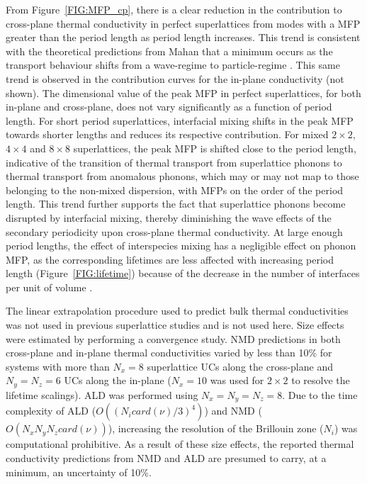 \documentclass[aps,prb,preprint,preprintnumbers,amsmath,amssymb,floatfix,superscriptaddress]{revtex4}
\begin{document}
From Figure~\ref{FIG:MFP_cp}, there is a clear reduction in the contribution to cross-plane thermal conductivity in perfect superlattices from modes with a MFP greater than the period length as period length increases. This trend is consistent with the theoretical predictions from Mahan that a minimum occurs as the transport behaviour shifts from a wave-regime to particle-regime \cite{PhysRevLett.84.927,PhysRevB.56.10754}. This same trend is observed in the contribution curves for the in-plane conductivity (not shown). The dimensional value of the peak MFP in perfect superlattices, for both in-plane and cross-plane, does not vary significantly as a function of period length. For short period superlattices, interfacial mixing shifts in the peak MFP towards shorter lengths and reduces its respective contribution. For mixed $2\times2$, $4\times4$ and $8\times8$ superlattices, the peak MFP is shifted close to the period length, indicative of the transition of thermal transport from superlattice phonons to thermal transport from anomalous phonons, which may or may not map to those belonging to the non-mixed dispersion, with MFPs on the order of the period length. This trend further supports the fact that superlattice phonons become disrupted by interfacial mixing, thereby diminishing the wave effects of the secondary periodicity upon cross-plane thermal conductivity. At large enough period lengths, the effect of interspecies mixing has a negligible effect on phonon MFP, as the corresponding lifetimes are less affected with increasing period length (Figure~\ref{FIG:lifetime}) because of the decrease in the number of interfaces per unit of volume \cite{PhysRevB.79.075316}.

The linear extrapolation procedure used to predict bulk thermal conductivities \cite{PhysRevB.81.214305} was not used in previous superlattice studies \cite{doi:10.1021/nl202186y,Luckyanova16112012} and is not used here. Size effects were estimated by performing a convergence study. NMD predictions in both cross-plane and in-plane thermal conductivities varied by less than 10\% for systems with more than $N_x=8$ superlattice UCs along the cross-plane and $N_y=N_z=6$ UCs along the in-plane ($N_x=10$ was used for $2\times2$ to resolve the lifetime scalings). ALD was performed using $N_x=N_y=N_z=8$. Due to the time complexity of ALD ($O((N_i card(\nu)/3)^4)$) and NMD ($O(N_x  N_y N_z card(\nu))$), increasing the resolution of the Brillouin zone ($N_i$) was computational prohibitive. As a result of these size effects, the reported thermal conductivity predictions from NMD and ALD are presumed to carry, at a minimum, an uncertainty of 10\%.
\end{document}
